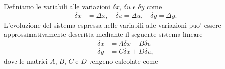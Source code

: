 \documentclass[a4paper, 11pt]{article}
\begin{document}
\vspace{0.2 cm}
%
Definiamo le variabili alle variazioni $\delta x$, $\delta u$ e $\delta y$ come 
%
\begin{align*}
	\delta x &= \Delta x, 
	\quad
	\delta u = \Delta u, 
	\quad
	\delta y = \Delta y.
\end{align*}
%
L'evoluzione del sistema espressa nelle variabili alle variazioni puo' essere approssimativamente descritta mediante il seguente sistema lineare
%
\begin{subequations}\label{eq:linearized_system}
\begin{align}
	\delta \dot{x} &= A\delta x + B\delta u
	\\
	\delta y &= C\delta x + D\delta u,
\end{align}
\end{subequations}
%
dove le matrici $A$, $B$, $C$ e $D$ vengono calcolate come
%
\end{document}
